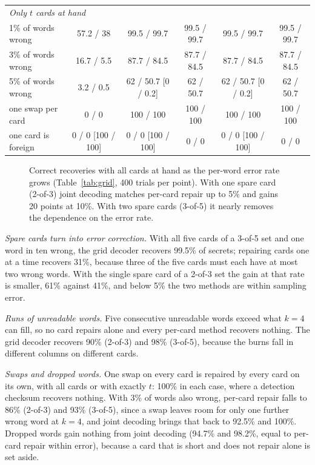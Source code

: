 \documentclass[numeric]{anvil-paper}
\begin{document}
\begin{table}[!htb]
\begin{tabular}{lccccc}
\midrule
\multicolumn{6}{l}{\emph{Only $t$ cards at hand}}\\
1\% of words wrong & 57.2 / 38 & 99.5 / 99.7 & 99.5 / 99.7 & 99.5 / 99.7 & 99.5 / 99.7 \\
3\% of words wrong & 16.7 / 5.5 & 87.7 / 84.5 & 87.7 / 84.5 & 87.7 / 84.5 & 87.7 / 84.5 \\
5\% of words wrong & 3.2 / 0.5 & 62 / 50.7 {\scriptsize[0 / 0.2]} & 62 / 50.7 & 62 / 50.7 {\scriptsize[0 / 0.2]} & 62 / 50.7 \\
one swap per card & 0 / 0 & 100 / 100 & 100 / 100 & 100 / 100 & 100 / 100 \\
one card is foreign & 0 / 0 {\scriptsize[100 / 100]} & 0 / 0 {\scriptsize[100 / 100]} & 0 / 0 & 0 / 0 {\scriptsize[100 / 100]} & 0 / 0 \\
\bottomrule
\end{tabular}
\end{table}

\begin{figure}[!htb]
\centering

\caption{Correct recoveries with all cards at hand as the per-word error rate
grows (Table~\ref{tab:grid}, 400 trials per point). With one spare card
(2-of-3) joint decoding matches per-card repair up to 5\% and gains 20 points
at 10\%. With two spare cards (3-of-5) it nearly removes the dependence on
the error rate.}
\label{fig:rates}
\end{figure}

\emph{Spare cards turn into error correction.} With all five cards of a 3-of-5
set and one word in ten wrong, the grid decoder recovers 99.5\% of secrets;
repairing cards one at a time recovers 31\%, because three of the five cards
must each have at most two wrong words. With the single spare card of a 2-of-3
set the gain at that rate is smaller, 61\% against 41\%, and below 5\% the two
methods are within sampling error.

\emph{Runs of unreadable words.} Five consecutive unreadable words exceed what
$k=4$ can fill, so no card repairs alone and every per-card method recovers
nothing. The grid decoder recovers 90\% (2-of-3) and 98\% (3-of-5), because
the burns fall in different columns on different cards.

\emph{Swaps and dropped words.} One swap on every card is repaired by every card
on its own, with all cards or with exactly $t$: 100\% in each case, where a
detection checksum recovers nothing. With 3\% of words also wrong, per-card
repair falls to 86\% (2-of-3) and 93\% (3-of-5), since a swap leaves room for
only one further wrong word at $k=4$, and joint decoding brings that back to
92.5\% and 100\%. Dropped words gain nothing from joint decoding (94.7\% and
98.2\%, equal to per-card repair within error), because a card that is short
and does not repair alone is set aside.
\end{document}
